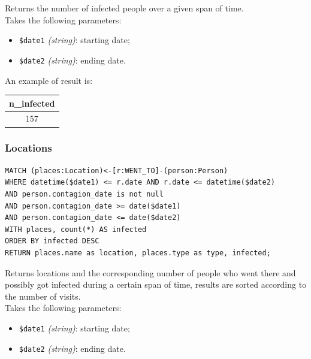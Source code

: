 \documentclass[12pt, a4paper]{article}
\begin{document}
\noindent %
Returns the number of infected people over a given span of time. \\
Takes the following parameters: 

\begin{itemize}
    \item \texttt{\$date1} \emph{(string)}: starting date;
    \item \texttt{\$date2} \emph{(string)}: ending date.
\end{itemize}

\noindent %
An example of result is:
\begin{center}
    \begin{tabular}{ |c| } 
        \hline
        n\_infected \\
        \hline
        157 \\
        \hline
    \end{tabular}
\end{center}

\subsubsection{Locations}

\begin{tcolorbox}[fontupper=\scriptsize]
    \begin{verbatim}
MATCH (places:Location)<-[r:WENT_TO]-(person:Person)
WHERE datetime($date1) <= r.date AND r.date <= datetime($date2) 
AND person.contagion_date is not null
AND person.contagion_date >= date($date1) 
AND person.contagion_date <= date($date2)
WITH places, count(*) AS infected
ORDER BY infected DESC
RETURN places.name as location, places.type as type, infected;
    \end{verbatim}
\end{tcolorbox}

\noindent %
Returns locations and the corresponding number of people who went there and 
possibly got infected during a certain span of time, results are sorted 
according to the number of visits. \\
Takes the following parameters: 

\begin{itemize}
    \item \texttt{\$date1} \emph{(string)}: starting date;
    \item \texttt{\$date2} \emph{(string)}: ending date.
\end{itemize}
\end{document}
